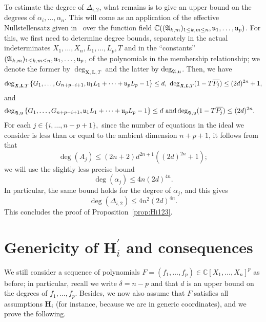 \documentclass[12pt]{article}
\def\A{\mathfrak{A}}
\def\Lb{\textit{\textbf{L}}}
\def\Xb{\textit{\textbf{X}}}
\def\pjb{\overline{P_{j}}}
\def\D{\Delta}
\def\C{\mathbb{C}}
\begin{document}
\noindent
To estimate the degree of $\D_{i,2}$, what remains is to give an upper
bound on the degrees of $\alpha_i,\dots,\alpha_n$. This will come as
an application of the effective Nullstellensatz given in~\cite{EN}
over the function field $\C((\A_{k,m})_{1 \le k,m \le n},\frak
u_1,\dots,\frak u_p)$. For this, we first need to determine degree
bounds, separately in the actual indeterminates $
X_1,\dots,X_n,L_1,\dots,L_p,T$ and in the ``constants'' $(\A_{k,m})_{1
  \le k,m \le n},\frak u_1,\dots,\frak u_p$, of the polynomials in the
membership relationship; we denote the former by $\deg_{\bm X, \bm L,
  T}$ and the latter by $\deg_{\A,\frak u}$. Then, we have
\begin{align*}
\deg_{\Xb,\Lb,T}
\left\{ G_1,\dots,G_{n+p-i+1}, \frak u_1 L_1 + \cdots + \frak u_p L_p-1\right\}
\leq d, ~
\deg_{\Xb,\Lb,T}(1-T\pjb) \leq (2d)^{2n} +1, 
\end{align*}
and 
\begin{align*}
\deg_{\A,\frak u}  
\left\{  G_1,\dots,G_{n+p-i+1}, \frak u_1 L_1 + \cdots + \frak u_p L_p-1\right\} 
\leq d~\textrm{and}
\deg_{\A,\frak u}(1-T\pjb)& \leq (2d)^{2n}.
\end{align*}
For each $j \in \{i,\hdots,n-p+1\},$ since the number of equations in
the ideal we consider is less than or equal to the ambient dimension $n+p+1$,
it follows from \cite[Theorem 0.5]{EN} that
\[
\deg(A_j)  \le (2n+2)d^{2n+1}((2d)^{2n}+1);
\]
we will use the slightly less precise bound \[\deg(\alpha_j) \le
4n(2d)^{4n}.\] In particular, the same bound holds for the degree
of $\alpha_j$, and this gives
\[\deg(\D_{i,2}) \le 4n^2(2d)^{4n}.\]
This concludes the proof of Proposition~\ref{prop:Hi123}.


\section{Genericity of $\textbf{H}_i^{'}$ and consequences}\label{Sec:Hip}

We still consider a sequence of polynomials $F= (f_1,\hdots,f_p) \in
\C[X_1,\hdots,X_n]^p$ as before; in particular, recall we write
$\delta = n-p$ and that $d$ is an upper bound on the degrees of
$f_1,\dots,f_p$.  Besides, we now also assume that $F$ satisfies all
assumptions $\bm H_i$ (for instance, because we are in generic
coordinates), and we prove the following.
\end{document}
